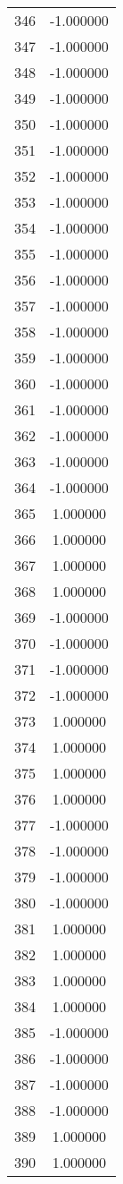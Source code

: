 \documentclass[12pt]{article}
\begin{document}
\begin{longtable}{@{}cc@{}}
346 & -1.000000 \\
347 & -1.000000 \\
348 & -1.000000 \\
349 & -1.000000 \\
350 & -1.000000 \\
351 & -1.000000 \\
352 & -1.000000 \\
353 & -1.000000 \\
354 & -1.000000 \\
355 & -1.000000 \\
356 & -1.000000 \\
357 & -1.000000 \\
358 & -1.000000 \\
359 & -1.000000 \\
360 & -1.000000 \\
361 & -1.000000 \\
362 & -1.000000 \\
363 & -1.000000 \\
364 & -1.000000 \\
365 & 1.000000 \\
366 & 1.000000 \\
367 & 1.000000 \\
368 & 1.000000 \\
369 & -1.000000 \\
370 & -1.000000 \\
371 & -1.000000 \\
372 & -1.000000 \\
373 & 1.000000 \\
374 & 1.000000 \\
375 & 1.000000 \\
376 & 1.000000 \\
377 & -1.000000 \\
378 & -1.000000 \\
379 & -1.000000 \\
380 & -1.000000 \\
381 & 1.000000 \\
382 & 1.000000 \\
383 & 1.000000 \\
384 & 1.000000 \\
385 & -1.000000 \\
386 & -1.000000 \\
387 & -1.000000 \\
388 & -1.000000 \\
389 & 1.000000 \\
390 & 1.000000 \\

\end{longtable}
\end{document}

